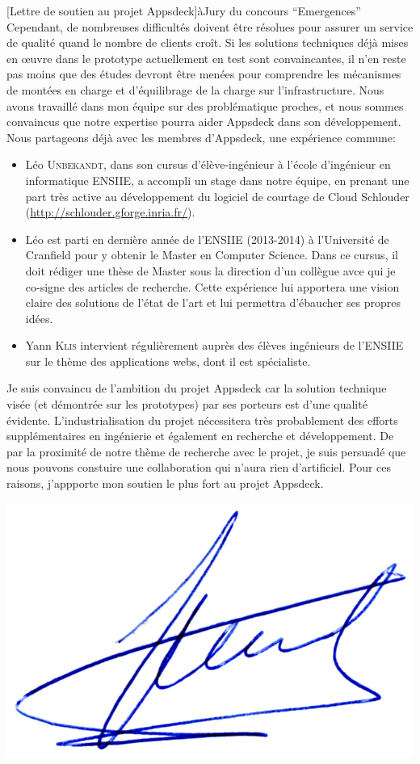 \documentclass[a4paper,10pt]{article}
\begin{document}
\begin{letter}[Lettre de soutien au projet Appsdeck]{à}{Jury du concours ``Emergences''}
Cependant,  de nombreuses  difficultés  doivent être  résolues  pour assurer  un
service de qualité quand le nombre de clients croît. Si les solutions techniques
déjà  mises   en  {\oe}uvre  dans   le  prototype  actuellement  en   test  sont
convaincantes, il n'en  reste pas moins que des études  devront être menées pour
comprendre les mécanismes de montées en charge et d'équilibrage de la charge sur
l'infrastructure. Nous  avons travaillé  dans mon  équipe sur  des problématique
proches, et  nous sommes  convaincus que notre  expertise pourra  aider Appsdeck
dans son  développement. Nous partageons  déjà avec les membres  d'Appsdeck, une
expérience commune:
\begin{itemize}
\item  Léo  \textsc{Unbekandt},  dans  son cursus  d'élève-ingénieur  à  l'école
  d'ingénieur en informatique ENSIIE, a accompli  un stage dans notre équipe, en
  prenant une part très active au développement du logiciel de courtage de Cloud
  Schlouder (\url{http://schlouder.gforge.inria.fr/}).
\item Léo est parti en dernière  année de l'ENSIIE (2013-2014) à l'Université de
  Cranfield pour  y obtenir le  Master en Computer  Science. Dans ce  cursus, il
  doit rédiger une thèse  de Master sous la direction d'un  collègue avce qui je
  co-signe des articles de recherche.  Cette expérience lui apportera une vision
  claire  des solutions  de  l'état de  l'art et  lui  permettra d'ébaucher  ses
  propres idées.
\item Yann \textsc{Klis} intervient régulièrement auprès des élèves ingénieurs de
 l'ENSIIE sur le thème des applications webs, dont il est spécialiste.
\end{itemize}

Je suis  convaincu de l'ambition  du projet  Appsdeck car la  solution technique
visée  (et démontrée  sur les  prototypes) par  ses porteurs  est d'une  qualité
évidente.   L'industrialisation  du  projet nécessitera  très  probablement  des
efforts   supplémentaires   en  ingénierie   et   également   en  recherche   et
développement. De par  la proximité de notre thème de  recherche avec le projet,
je suis  persuadé que nous pouvons  constuire une collaboration qui  n'aura rien
d'artificiel.  Pour ces  raisons, j'appporte mon soutien le plus  fort au projet
Appsdeck.



\end{letter}
\begin{flushright}
\includegraphics[width=.30\textwidth]{signgenaud.jpg}
\end{flushright}
%
%
\end{document}
